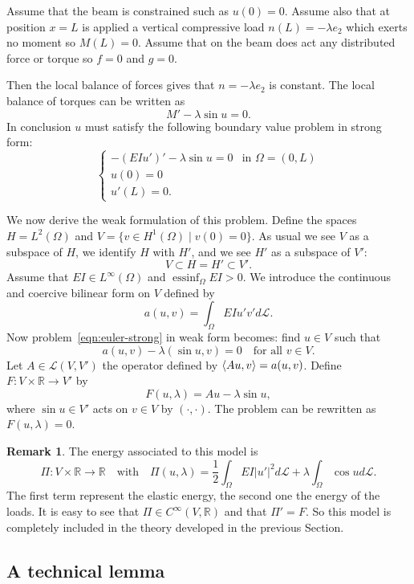 \documentclass[a4paper,11pt]{article}
\theoremstyle{definition}
\newtheorem{rmk}[prop]{Remark}
\DeclareMathOperator{\essinf}{essinf}
\DeclarePairedDelimiter{\dual}{\langle}{\rangle}
\begin{document}
Assume that the beam is constrained such as $u(0)=0$. Assume also that at position $x=L$ is applied a vertical compressive load $n(L)=-\lambda e_2$ which exerts no moment so $M(L)=0$. Assume that on the beam does act any distributed force or torque so $f=0$ and $g=0$.

Then the local balance of forces gives that $n=-\lambda e_2$ is constant. The local balance of torques can be written as
\[
M'-\lambda\sin u=0.
\]
In conclusion $u$ must satisfy the following boundary value problem in strong form:
\begin{equation}
\label{eqn:euler-strong}
\begin{cases}
-(EIu')'-\lambda\sin u=0 & \text{in $\Omega=(0,L)$} \\
u(0)=0 \\
u'(L)=0.
\end{cases}
\end{equation}

We now derive the weak formulation of this problem. Define the spaces $H=L^2(\Omega)$ and $V=\{v\in H^1(\Omega)\;|\;v(0)=0\}$. As usual we see $V$ as a subspace of $H$, we identify $H$ with $H'$, and we see $H'$ as a subspace of $V'$:
\[
V\subset H=H'\subset V'.
\]
Assume that $EI\in L^\infty(\Omega)$ and $\essinf_\Omega EI>0$. We introduce the continuous and coercive bilinear form on $V$ defined by
\[
a(u,v)=\int_\Omega EIu'v'd\mathscr{L}.
\]
Now problem~\eqref{eqn:euler-strong} in weak form becomes: find $u\in V$ such that
\[
a(u,v)-\lambda(\sin u,v)=0\quad\text{for all $v\in V$}.
\]
Let $A\in\mathscr{L}(V,V')$ the operator defined by $\dual{Au,v}=a(u,v)$. Define $F\colon V\times\mathbb{R}\to V'$ by
\[
F(u,\lambda)=Au-\lambda\sin u,
\]
where $\sin u\in V'$ acts on $v\in V$ by $(\cdot,\cdot)$. The problem can be rewritten as $F(u,\lambda)=0$.

\begin{rmk}
The energy associated to this model is
\[
\Pi\colon V\times\mathbb{R}\to\mathbb{R}\quad\text{with}\quad\Pi(u,\lambda)=\frac{1}{2}\int_\Omega EI|u'|^2d\mathscr{L}+\lambda\int_\Omega\cos ud\mathscr{L}.
\]
The first term represent the elastic energy, the second one the energy of the loads. It is easy to see that $\Pi\in C^\infty(V,\mathbb{R})$ and that $\Pi'=F$. So this model is completely included in the theory developed in the previous Section.
\end{rmk}

\subsection{A technical lemma}
\end{document}
